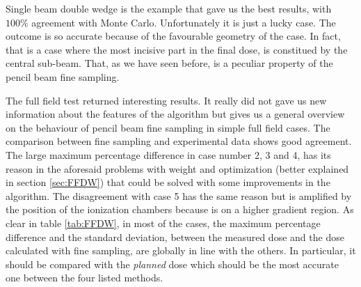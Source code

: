 \documentclass[12pt, a4paper, twoside]{book}
\begin{document}
Single beam double wedge is the example that gave us the best results, with $100\%$ agreement with Monte Carlo. Unfortunately it is just a lucky case. The outcome is so accurate because of the favourable geometry of the case. In fact, that is a case where the most incisive part in the final dose, is constitued by the central sub-beam. That, as we have seen before, is a peculiar property of the pencil beam fine sampling.

The full field test returned interesting results. It really did not gave us new information about the features of the algorithm but gives us a general overview on the behaviour of pencil beam fine sampling in simple full field cases. The comparison between fine sampling and experimental data shows good agreement. 
The large maximum percentage difference in case number 2, 3 and 4, has its reason in the aforesaid problems with weight and optimization (better explained in section \ref{sec:FFDW}) that could be solved with some improvements in the algorithm. The disagreement with case 5 has the same reason but is amplified by the position of the ionization chambers because is on a higher gradient region.
As clear in table \ref{tab:FFDW},  in most of the cases, the maximum percentage difference and the standard deviation, between the measured dose and the dose calculated with fine sampling, are globally in line with the others. In particular, it should be compared with the \emph{planned} dose which should be the most accurate one between the four listed methods.
\end{document}

